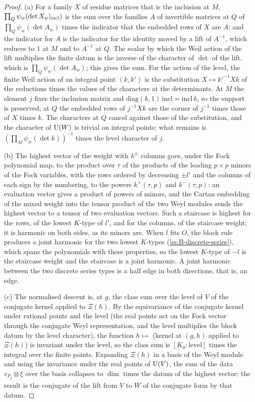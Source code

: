 \begin{proof}
(a) For a family $X$ of residue matrices that is the inclusion at $M$, $\prod_Q\psi_w(\det X_w|_{\rm incl})$ is the sum over the families $A$ of invertible matrices at $Q$ of $\prod_Q\psi_w(\det A_w)$ times the indicator that the embedded rows of $X$ are $A$; and the indicator for $A$ is the indicator for the identity moved by a lift of
$A^{-1}$, which reduces to $1$ at $M$ and to $A^{-1}$ at $Q$. The scalar by which the Weil action of the lift multiplies the finite datum is the inverse of the character of $\det$ of the lift, which is $\prod_Q\psi_w(\det A_w)$; this gives the sum. For the action of the level, the finite Weil action of an integral point $(k,k')$ is the
substitution $X\mapsto k'^{-1}Xk$ of the reductions times the values of the characters at the determinants. At $M$ the element $j$ fixes the inclusion matrix and $\mathrm{diag}(k,1)\,\mathrm{incl}=\mathrm{incl}\,k$, so the support is preserved; at $Q$ the embedded rows of $j^{-1}Xk$ are the corner of $j^{-1}$ times those of $X$
times $k$. The characters at $Q$ cancel against those of the substitution, and the character of $\operatorname{U}(W)$ is trivial on integral points; what remains is $(\prod_M\psi_w(\det k))^{-1}$ times the level character of $j$.

(b) The highest vector of the weight with $k^\pm$ columns goes, under the Fock polynomial map, to the product over $\tau$ of the products of the leading $p\times p$ minors of the Fock variables, with the rows ordered by decreasing $\pm l'$ and the columns of each sign by the numbering, to the powers $k^+(\tau,p)$ and $k^-(\tau,p)$: an
evaluation vector gives a product of powers of minors, and the Cartan embedding of the mixed weight into the tensor product of the two Weyl modules sends the highest vector to a tensor of two evaluation vectors. Such a staircase is highest for the rows, of the lowest $K$-type of $l'$, and for the columns, of the staircase weight;
it is harmonic on both sides, as its minors are. When $l$ fits $O$, the block rule produces a joint harmonic for the two lowest $K$-types (\cref{ss:B-discrete-series}), which spans the polynomials with these properties, so the lowest $K$-type of $-l$ is the staircase weight and the staircase is a joint harmonic. A joint harmonic
between the two discrete series types is a half edge in both directions, that is, an edge.

(c) The normalised descent is, at $g$, the class sum over the level of $V$ of the conjugate kernel applied to $\Xi(h)$. By the equivariance of the conjugate kernel under rational points and the level (the real points act on the Fock vector through the conjugate Weyl representation, and the level multiplies the block datum by the
level character), the function $h\mapsto$ (kernel at $(g,h)$ applied to $\Xi(h)$) is invariant under the level, so the class sum is $[K_0:\mathrm{level}]$ times the integral over the finite points. Expanding $\Xi(h)$ in a basis of the Weyl module and using the invariance under the real points of $\operatorname{U}(V)$, the sum of the data
$v_{P_{\bar\xi}}\otimes\xi$ over the basis collapses to $\dim$ times the datum of the highest vector; the result is the conjugate of the lift from $V$ to $W$ of the conjugate form by that datum.
\end{proof}


